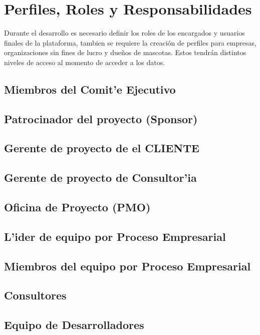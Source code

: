 \documentclass[letterpaper,openright,10pt,oneside]{report}
\begin{document}
		\section{Perfiles, Roles y Responsabilidades}
		Durante el desarrollo es necesario definir los roles de los encargados y usuarios finales de la plataforma, tambien se requiere la creación de perfiles para empresas, organizaciones sin fines de lucro y dueños de mascotas. Estos tendrán distintos niveles de acceso al momento de acceder a los datos.
			\subsection{Miembros del Comit'e Ejecutivo}
			\subsection{Patrocinador del proyecto (Sponsor)}
			\subsection{Gerente de proyecto de el CLIENTE}
			\subsection{Gerente de proyecto de Consultor'ia}
			\subsection{Oficina de Proyecto (PMO)}
			\subsection{L'ider de equipo por Proceso Empresarial}
			\subsection{Miembros del equipo por Proceso Empresarial}
			\subsection{Consultores}
			\subsection{Equipo de Desarrolladores}
\end{document}

